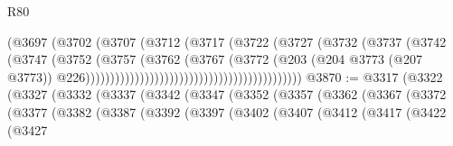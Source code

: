 \begin{lexlean}{R80}
\begin{coremodule}
                                                          (@3697
                                                            (@3702
                                                              (@3707
                                                                (@3712
                                                                  (@3717
                                                                    (@3722
                                                                      (@3727
                                                                        (@3732
                                                                          (@3737
                                                                            (@3742
                                                                              (@3747
                                                                                (@3752
                                                                                  (@3757
                                                                                    (@3762
                                                                                      (@3767
                                                                                        (@3772
                                                                                          (@203
                                                                                            (@204
                                                                                              @3773
                                                                                              (@207
                                                                                                @3773))
                                                                                            @226))))))))))))))))))))))))))))))))))))))))))))
@3870 := @3317
    (@3322
      (@3327
        (@3332
          (@3337
            (@3342
              (@3347
                (@3352
                  (@3357
                    (@3362
                      (@3367
                        (@3372
                          (@3377
                            (@3382
                              (@3387
                                (@3392
                                  (@3397
                                    (@3402
                                      (@3407
                                        (@3412
                                          (@3417
                                            (@3422
                                              (@3427

\end{coremodule}
\end{lexlean}
